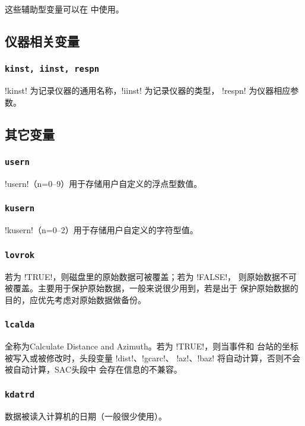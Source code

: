 这些辅助型变量可以在  中使用。

\subsection{仪器相关变量}
\subsubsection{\texttt{kinst, iinst\dag, respn}\dag}
!kinst! 为记录仪器的通用名称，!iinst! 为记录仪器的类型，
!respn! 为仪器相应参数。

\subsection{其它变量}
\subsubsection{\texttt{usern}}
!usern!（n=0--9）用于存储用户自定义的浮点型数值。

\subsubsection{\texttt{kusern}}
!kusern!（n=0--2）用于存储用户自定义的字符型值。

\subsubsection{\texttt{lovrok}}
若为 !TRUE!，则磁盘里的原始数据可被覆盖；若为 !FALSE!，
则原始数据不可被覆盖。主要用于保护原始数据，一般来说很少用到，若是出于
保护原始数据的目的，应优先考虑对原始数据做备份。

\subsubsection{\texttt{lcalda}}
全称为Calculate Distance and Azimuth。若为 !TRUE!，则当事件和
台站的坐标被写入或被修改时，头段变量 !dist!、!gcarc!、
!az!、!baz! 将自动计算，否则不会被自动计算，SAC头段中
会存在信息的不兼容。

\subsubsection{\texttt{kdatrd}}
数据被读入计算机的日期（一般很少使用）。

